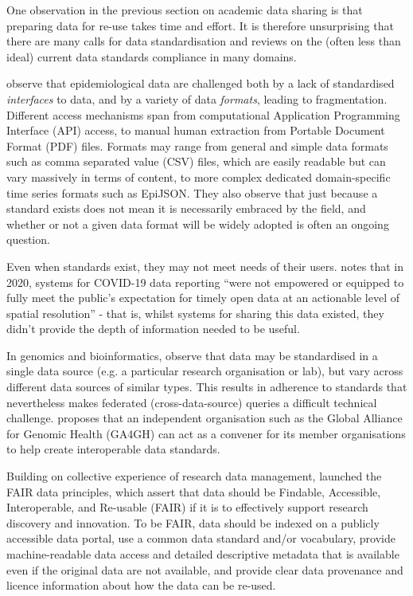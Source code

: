 \documentclass{CUP-JNL-DAP}%
\begin{document}
One observation in the previous section on academic data sharing is that preparing data for re-use takes time and effort. It is therefore unsurprising that there are many calls for data standardisation and reviews on the (often less than ideal) current data standards compliance in many domains.  

\cite{fairchild_epidemiological_2018} observe that epidemiological data are challenged both by a lack of standardised \textit{interfaces} to data, and by a variety of data \textit{formats}, leading to fragmentation. Different access mechanisms span from computational Application Programming Interface (API) access, to manual human extraction from Portable Document Format (PDF) files. Formats may range from general and simple data formats such as comma separated value (CSV) files, which are easily readable but can vary massively in terms of content, to more complex dedicated domain-specific time series formats such as EpiJSON. They also observe that just because a standard exists does not mean it is necessarily embraced by the field, and whether or not a given data format will be widely adopted is often an ongoing question. 

Even when standards exist, they may not meet needs of their users. \cite{gardner_need_2021} notes that in 2020, systems for COVID-19 data reporting \enquote{were not empowered or equipped to fully meet the public's expectation for timely open data at an actionable level of spatial resolution} - that is, whilst systems for sharing this data existed, they didn't provide the depth of information needed to be useful.  

In genomics and bioinformatics, \cite{thorogood_international_2021} observe that data may be standardised in a single data source (e.g. a particular research organisation or lab), but vary across different data sources of similar types. This results in adherence to standards that nevertheless makes federated (cross-data-source) queries a difficult technical challenge. \cite{thorogood_international_2021} proposes that an independent organisation such as the Global Alliance for Genomic Health (GA4GH) can act as a convener for its member organisations to help create interoperable data standards. 

Building on collective experience of research data management, \cite{wilkinson_fair_2016} launched the FAIR data principles, which assert that data should be Findable, Accessible, Interoperable, and Re-usable (FAIR) if it is to effectively support research discovery and innovation. To be FAIR, data should be indexed on a publicly accessible data portal, use a common data standard and/or vocabulary, provide machine-readable data access and detailed descriptive metadata that is available even if the original data are not available, and provide clear data provenance and licence information about how the data can be re-used. 
\end{document}

